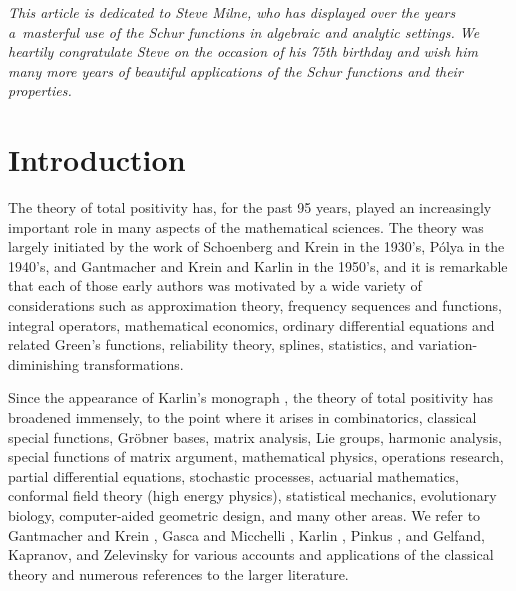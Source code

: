 \documentclass[pdftex]{sigma}
\numberwithin{equation}{section}
\begin{document}


\begin{flushright}
\begin{minipage}{80mm}\it
This article is dedicated to Steve Milne, who has displayed over the years a~masterful use of the Schur functions in algebraic and analytic settings. We heartily congratulate Steve on the occasion of his 75th birthday and wish him many more years of beautiful applications of the Schur functions and their properties.
\end{minipage}
\end{flushright}

\renewcommand{\thefootnote}{\arabic{footnote}}
\setcounter{footnote}{0}

\section{Introduction}\label{sec_intro}

The theory of total positivity has, for the past 95 years, played an increasingly important role in many aspects of the mathematical sciences. The theory was largely initiated by the work of Schoenberg \cite{Schoenberg} and Krein \cite{Krein} in the 1930's, P\'olya \cite{Polya} in the 1940's, and Gantmacher and Krein \cite{GantmacherKrein} and Karlin \cite{Karlin} in the 1950's, and it is remarkable that each of those early authors was motivated by a wide variety of considerations such as approximation theory, frequency sequences and functions, integral operators, mathematical economics, ordinary differential equations and related Green's functions, reliability theory, splines, statistics, and variation-diminishing transformations.

Since the appearance of Karlin's monograph \cite{Karlin}, the theory of total positivity has broadened immensely, to the point where it arises in combinatorics, classical special functions, Gr\"obner bases, matrix analysis, Lie groups, harmonic analysis, special functions of matrix argument, mathematical physics, operations research, partial differential equations, stochastic processes, actuarial mathematics, conformal field theory (high energy physics), statistical mechanics, evolutionary biology, computer-aided geometric design, and many other areas. We refer to Gantmacher and Krein \cite{GantmacherKrein}, Gasca and Micchelli \cite{GascaMicchelli}, Karlin \cite{Karlin,Karlin2}, Pinkus \cite{Pinkus}, and Gelfand, Kapranov, and Zelevinsky \cite{GKZ} for various accounts and applications of the classical theory and numerous references to the larger literature.
\end{document}
